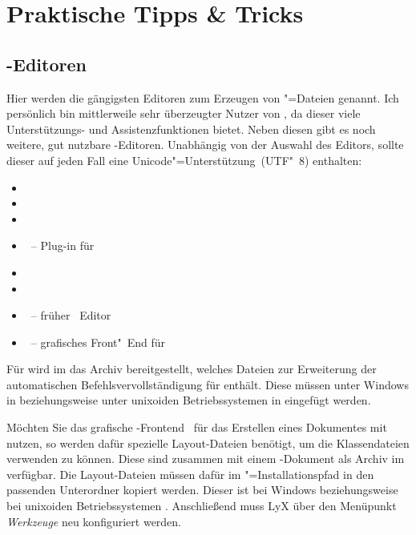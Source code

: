 \newcommand*\TaT{\hyperref[sec:tips]{Tipps \& Tricks}:\xspace}
\chapter{Praktische Tipps \& Tricks}
%
\section{-Editoren}
%
%
Hier werden die gängigsten Editoren zum Erzeugen von "=Dateien 
genannt. Ich persönlich bin mittlerweile sehr überzeugter Nutzer von 
, da dieser viele Unterstützungs- und 
Assistenzfunktionen bietet. Neben diesen gibt es noch weitere, gut nutzbare 
-Editoren. Unabhängig von der Auswahl des Editors, sollte dieser 
auf jeden Fall eine Unicode"=Unterstützung~(UTF"~8) enthalten:
%
\begin{itemize}
\item {}
\item {}
\item {}
\item {}~-- Plug-in für 
\item {}
\item {}
\item {}~-- früher ~Editor
\item {}~-- grafisches Front"~End für 
\end{itemize}
%
Für  wird im \GitHubRepo* das Archiv 
%
{} bereitgestellt, welches Dateien zur Erweiterung 
der automatischen Befehlsvervollständigung für \TUDScript enthält. Diese müssen 
unter Windows in  beziehungsweise 
unter unixoiden Betriebssystemen in  eingefügt werden.

Möchten Sie das grafische -Frontend~ 
für das Erstellen eines Dokumentes mit \TUDScript nutzen, so werden dafür 
spezielle Layout-Dateien benötigt, um die Klassendateien verwenden zu können. 
Diese sind zusammen mit einem -Dokument als Archiv 
%
{} im \GitHubRepo* verfügbar. Die Layout-Dateien müssen 
dafür im "=Installationspfad in den passenden 
Unterordner kopiert werden. Dieser ist bei Windows
beziehungsweise bei unixoiden Betriebssystemen .
Anschließend muss LyX über den Menüpunkt \emph{Werkzeuge} neu konfiguriert 
werden. 



